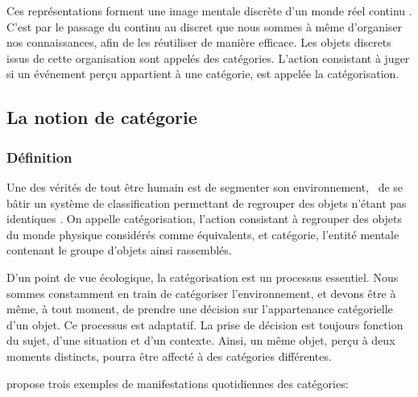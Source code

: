 Ces représentations forment une image mentale discrète d'un monde réel continu \citep{houde1998vocabulaire}. C'est par le passage du continu au discret que nous sommes à même d'organiser nos connaissances, afin de les réutiliser de manière efficace. Les objets discrets issus de cette organisation sont appelés des catégories. L'action consistant à juger si un événement perçu appartient à une catégorie, est appelée la catégorisation.

\subsection{La notion de catégorie}

\subsubsection{Définition}
\label{sec:ch3_categorieDef}

Une des vérités de tout être humain est de segmenter son environnement, \ie~de se bâtir un système de classification permettant de regrouper des objets n'étant pas identiques \citep[p. 1]{rosch1978cognition}. On appelle catégorisation, l'action consistant à regrouper des objets du monde physique considérés comme équivalents, et catégorie, l'entité mentale contenant le groupe d'objets ainsi rassemblés. 
 
D'un point de vue écologique, la catégorisation est un processus essentiel. Nous sommes constamment en train de catégoriser l'environnement, et devons être à même, à tout moment, de prendre une décision sur l'appartenance catégorielle d'un objet. Ce processus est adaptatif. La prise de décision est toujours fonction du sujet, d'une situation et d'un contexte. Ainsi, un même objet, perçu à deux moments distincts, pourra être affecté à des catégories différentes. 


\citep{anderson1991adaptive} propose trois exemples de manifestations quotidiennes des catégories:

